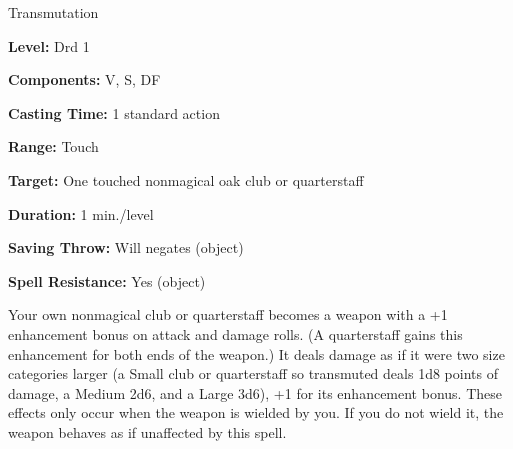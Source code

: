 
Transmutation

\textbf{Level:} Drd 1

\textbf{Components:} V, S, DF

\textbf{Casting Time:} 1 standard action

\textbf{Range:} Touch

\textbf{Target:} One touched nonmagical oak club or quarterstaff

\textbf{Duration:} 1 min./level

\textbf{Saving Throw:} Will negates (object)

\textbf{Spell Resistance:} Yes (object)

Your own nonmagical club or quarterstaff becomes a weapon with a +1 enhancement 
bonus on attack and damage rolls. (A quarterstaff gains this enhancement for both 
ends of the weapon.) It deals damage as if it were two size categories larger (a 
Small club or quarterstaff so transmuted deals 1d8 points of damage, a Medium 2d6, 
and a Large 3d6), +1 for its enhancement bonus. These effects only occur when the 
weapon is wielded by you. If you do not wield it, the weapon behaves as if unaffected 
by this spell.

